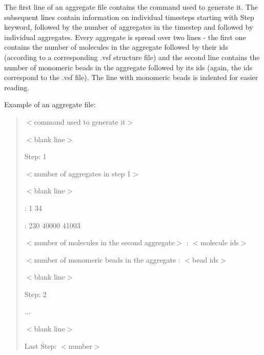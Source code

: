The first line of an aggregate file contains the command used to generate it. The subsequent lines contain information on individual timesteps starting with {\ttfamily Step} keyword, followed by the number of aggregates in the timestep and followed by individual aggregates. Every aggregate is spread over two lines -\/ the first one contains the number of molecules in the aggregate followed by their ids (according to a corresponding {\ttfamily .vsf} structure file) and the second line contains the number of monomeric beads in the aggregate followed by its ids (again, the ids correspond to the {\ttfamily .vsf} file). The line with monomeric beads is indented for easier reading.

Example of an aggregate file\+:

\begin{quote}
{\ttfamily $<$command used to generate it$>$}

{\ttfamily $<$blank line$>$}

{\ttfamily Step\+: 1}

{\ttfamily $<$number of aggregates in step 1$>$}

{\ttfamily $<$blank line$>$}

{ \+: 1 34}

{ \+: 230 40000 41003}

{\ttfamily $<$number of molecules in the second aggregate$>$ \+: $<$molecule ids$>$}

{\ttfamily $<$number of monomeric beads in the aggregate \+: $<$bead ids$>$}

{\ttfamily $<$blank line$>$}

{\ttfamily Step\+: 2}

{\ttfamily ...}

{\ttfamily $<$blank line$>$}

{\ttfamily Last Step\+: $<$number$>$}\end{quote}
